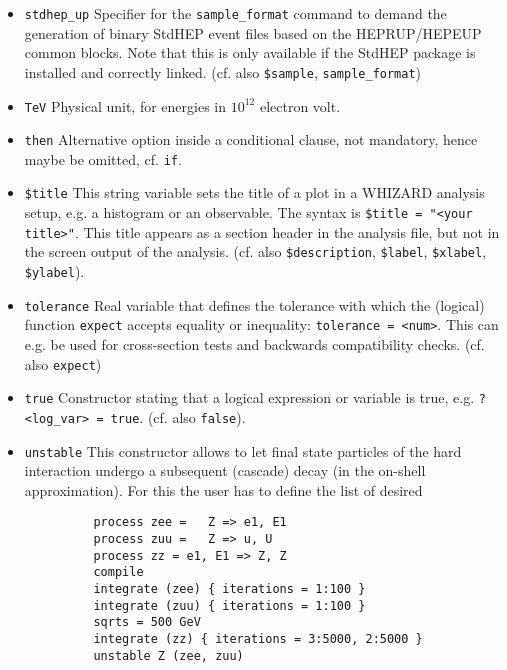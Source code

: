 \documentclass[12pt]{book}
\newcommand{\ttt}[1]{\texttt{#1}}
\begin{document}
\begin{itemize}
\item
\ttt{stdhep\_up} \newline 
Specifier for the \ttt{sample\_format} command to demand the
generation of binary StdHEP event files based on the HEPRUP/HEPEUP common
blocks. Note that this is only available if the StdHEP package is
installed and correctly linked. (cf. also 
\ttt{\$sample}, \ttt{sample\_format}) 
\item
\ttt{TeV} \newline
Physical unit, for energies in $10^{12}$ electron volt.
\item
\ttt{then} \newline
Alternative option inside a conditional clause, not mandatory, hence
maybe be omitted, cf. \ttt{if}.
\item
\ttt{\$title} \newline
This string variable sets the title of a plot in a WHIZARD analysis
setup, e.g. a histogram or an observable. The syntax is \ttt{\$title =
  "<your title>"}. This title appears as a section header in the
analysis file, but not in the screen output of the analysis.
(cf. also \ttt{\$description}, \ttt{\$label}, \ttt{\$xlabel},
\ttt{\$ylabel}). 
\item
\ttt{tolerance} \newline
Real variable that defines the tolerance with which the (logical)
function \ttt{expect} accepts equality or inequality:
\ttt{tolerance = <num>}. This can e.g. be used for cross-section tests
and backwards compatibility checks.
(cf. also \ttt{expect})
\item
\ttt{true} \newline
Constructor stating that a logical expression or variable is true,
e.g. \ttt{?<log\_var> = true}. (cf. also \ttt{false}).
\item
\ttt{unstable} \newline
This constructor allows to let final state particles of the hard
interaction undergo a subsequent (cascade) decay (in the on-shell
approximation). For this the user has to define the list of desired
\begin{figure}
  \begin{verbatim}
    process zee =   Z => e1, E1
    process zuu =   Z => u, U 
    process zz = e1, E1 => Z, Z
    compile
    integrate (zee) { iterations = 1:100 }
    integrate (zuu) { iterations = 1:100 }
    sqrts = 500 GeV
    integrate (zz) { iterations = 3:5000, 2:5000 }
    unstable Z (zee, zuu)
 \end{verbatim}

\end{figure}
\end{itemize}
\end{document}
